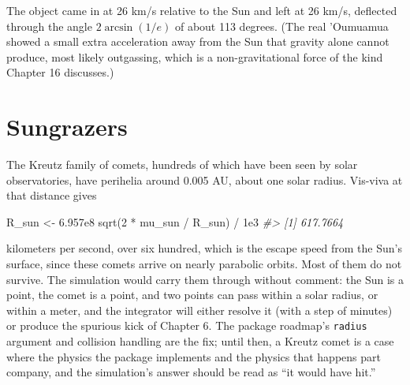 \documentclass[
  10.5pt,
  letterpaper,
]{scrbook}
\newenvironment{Shaded}{\begin{snugshade}}{\end{snugshade}}
\newcommand{\CommentTok}[1]{\textcolor[rgb]{0.00,0.00,0.00}{\textit{#1}}}
\newcommand{\DecValTok}[1]{\textcolor[rgb]{0.00,0.00,0.00}{#1}}
\newcommand{\FloatTok}[1]{\textcolor[rgb]{0.00,0.00,0.00}{#1}}
\newcommand{\FunctionTok}[1]{\textcolor[rgb]{0.00,0.00,0.00}{#1}}
\newcommand{\NormalTok}[1]{\textcolor[rgb]{0.00,0.00,0.00}{#1}}
\newcommand{\OtherTok}[1]{\textcolor[rgb]{0.00,0.00,0.00}{#1}}
\newcommand{\SpecialCharTok}[1]{\textcolor[rgb]{0.00,0.00,0.00}{#1}}
\newcommand{\StringTok}[1]{\textcolor[rgb]{0.00,0.00,0.00}{#1}}
\theoremstyle{definition}
\theoremstyle{plain}
\theoremstyle{remark}
\begin{document}
\begin{Shaded}
\end{Shaded}

The object came in at 26 km/s relative to the Sun and left at 26 km/s,
deflected through the angle \(2\arcsin(1/e)\) of about 113 degrees. (The
real 'Oumuamua showed a small extra acceleration away from the Sun that
gravity alone cannot produce, most likely outgassing, which is a
non-gravitational force of the kind Chapter 16 discusses.)

\section{Sungrazers}\label{sungrazers}

The Kreutz family of comets, hundreds of which have been seen by solar
observatories, have perihelia around 0.005 AU, about one solar radius.
Vis-viva at that distance gives

\begin{Shaded}
\begin{Highlighting}[]
\NormalTok{R\_sun }\OtherTok{\textless{}{-}} \FloatTok{6.957e8}
\FunctionTok{sqrt}\NormalTok{(}\DecValTok{2} \SpecialCharTok{*}\NormalTok{ mu\_sun }\SpecialCharTok{/}\NormalTok{ R\_sun) }\SpecialCharTok{/} \FloatTok{1e3}
\CommentTok{\#\textgreater{} [1] 617.7664}
\end{Highlighting}
\end{Shaded}

kilometers per second, over six hundred, which is the escape speed from
the Sun's surface, since these comets arrive on nearly parabolic orbits.
Most of them do not survive. The simulation would carry them through
without comment: the Sun is a point, the comet is a point, and two
points can pass within a solar radius, or within a meter, and the
integrator will either resolve it (with a step of minutes) or produce
the spurious kick of Chapter 6. The package roadmap's \texttt{radius}
argument and collision handling are the fix; until then, a Kreutz comet
is a case where the physics the package implements and the physics that
happens part company, and the simulation's answer should be read as ``it
would have hit.''
\end{document}

